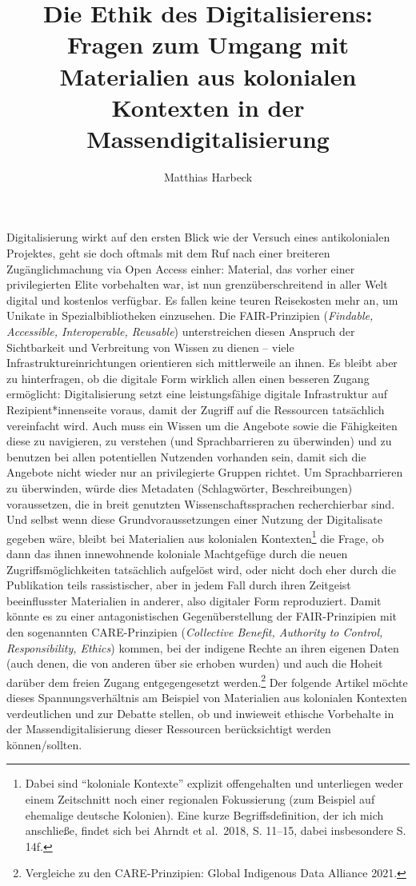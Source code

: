 \documentclass[a4paper,
fontsize=11pt,
oneside,
numbers=noperiodatend,
parskip=half-,
bibliography=totoc,
final
]{scrartcl}
\title{\LARGE{Die Ethik des Digitalisierens: Fragen zum Umgang mit Materialien aus kolonialen Kontexten in der Massendigitalisierung}}%
\author{Matthias Harbeck} %
\date{}
\begin{document}
\maketitle
\thispagestyle{fancyplain} 


Digitalisierung wirkt auf den ersten Blick wie der Versuch eines
antikolonialen Projektes, geht sie doch oftmals mit dem Ruf nach einer
breiteren Zugänglichmachung via Open Access einher: Material, das vorher
einer privilegierten Elite vorbehalten war, ist nun grenzüberschreitend
in aller Welt digital und kostenlos verfügbar. Es fallen keine teuren
Reisekosten mehr an, um Unikate in Spezialbibliotheken einzusehen. Die
FAIR-Prinzipien (\emph{Findable, Accessible, Interoperable, Reusable})
unterstreichen diesen Anspruch der Sichtbarkeit und Verbreitung von
Wissen zu dienen -- viele Infrastruktureinrichtungen orientieren sich
mittlerweile an ihnen. Es bleibt aber zu hinterfragen, ob die digitale
Form wirklich allen einen besseren Zugang ermöglicht: Digitalisierung
setzt eine leistungsfähige digitale Infrastruktur auf
Rezipient*innenseite voraus, damit der Zugriff auf die Ressourcen
tatsächlich vereinfacht wird. Auch muss ein Wissen um die Angebote sowie
die Fähigkeiten diese zu navigieren, zu verstehen (und Sprachbarrieren
zu überwinden) und zu benutzen bei allen potentiellen Nutzenden
vorhanden sein, damit sich die Angebote nicht wieder nur an
privilegierte Gruppen richtet. Um Sprachbarrieren zu überwinden, würde
dies Metadaten (Schlagwörter, Beschreibungen) voraussetzen, die in breit
genutzten Wissenschaftssprachen recherchierbar sind. Und selbst wenn
diese Grundvoraussetzungen einer Nutzung der Digitalisate gegeben wäre,
bleibt bei Materialien aus kolonialen Kontexten\footnote{Dabei sind
  \enquote{koloniale Kontexte} explizit offengehalten und unterliegen
  weder einem Zeitschnitt noch einer regionalen Fokussierung (zum
  Beispiel auf ehemalige deutsche Kolonien). Eine kurze
  Begriffsdefinition, der ich mich anschließe, findet sich bei Ahrndt et
  al.~2018, S. 11--15, dabei insbesondere S. 14f.} die Frage, ob dann
das ihnen innewohnende koloniale Machtgefüge durch die neuen
Zugriffsmöglichkeiten tatsächlich aufgelöst wird, oder nicht doch eher
durch die Publikation teils rassistischer, aber in jedem Fall durch
ihren Zeitgeist beeinflusster Materialien in anderer, also digitaler
Form reproduziert. Damit könnte es zu einer antagonistischen
Gegenüberstellung der FAIR-Prinzipien mit den sogenannten
CARE-Prinzipien (\emph{Collective Benefit, Authority to Control,
Responsibility, Ethics}) kommen, bei der indigene Rechte an ihren
eigenen Daten (auch denen, die von anderen über sie erhoben wurden) und
auch die Hoheit darüber dem freien Zugang entgegengesetzt
werden.\footnote{Vergleiche zu den CARE-Prinzipien: Global Indigenous
  Data Alliance 2021.} Der folgende Artikel möchte dieses
Spannungsverhältnis am Beispiel von Materialien aus kolonialen Kontexten
verdeutlichen und zur Debatte stellen, ob und inwieweit ethische
Vorbehalte in der Massendigitalisierung dieser Ressourcen berücksichtigt
werden können/sollten.
\end{document}
